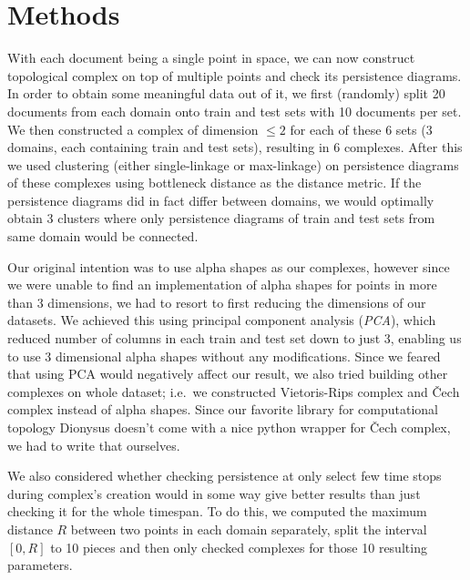 \section{Methods} 
\label{sec:methods}

With each document being a single point in space, we can now construct
topological complex on top of multiple points and check its persistence
diagrams. In order to obtain some meaningful data out of it, we first
(randomly) split 20 documents from each domain onto train and test sets with 10
documents per set. We then constructed a complex of dimension $\le 2$ for each
of these 6 sets (3 domains, each containing train and test sets), resulting in
6 complexes. After this we used clustering (either single-linkage or
max-linkage) on persistence diagrams of these complexes using bottleneck
distance as the distance metric. If the persistence diagrams did in fact differ
between domains, we would optimally obtain 3 clusters where only persistence
diagrams of train and test sets from same domain would be connected.

Our original intention was to use alpha shapes as our complexes, however since
we were unable to find an implementation of alpha shapes for points in more
than $3$ dimensions, we had to resort to first reducing the dimensions of our
datasets. We achieved this using principal component analysis (\textit{PCA}),
which reduced number of columns in each train and test set down to just 3,
enabling us to use 3 dimensional alpha shapes without any modifications. Since
we feared that using PCA would negatively affect our result, we also tried
building other complexes on whole dataset; i.e.\ we constructed Vietoris-Rips
complex and Čech complex instead of alpha shapes. Since our favorite library
for computational topology Dionysus doesn't come with a nice python wrapper for
Čech complex, we had to write that ourselves.

We also considered whether checking persistence at only select few time stops
during complex's creation would in some way give better results than just
checking it for the whole timespan. To do this, we computed the maximum
distance $R$ between two points in each domain separately, split the interval
$[0, R]$ to 10 pieces and then only checked complexes for those 10 resulting
parameters.
